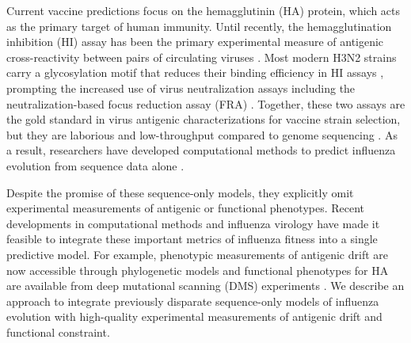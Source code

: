 Current vaccine predictions focus on the hemagglutinin (HA) protein, which acts as the primary target of human immunity.
Until recently, the hemagglutination inhibition (HI) assay has been the primary experimental measure of antigenic cross-reactivity between pairs of circulating viruses \citep{hirst1943studies}.
Most modern H3N2 strains carry a glycosylation motif that reduces their binding efficiency in HI assays \citep{Chambers:2015jt,Zost2017}, prompting the increased use of virus neutralization assays including the neutralization-based focus reduction assay (FRA) \citep{Okuno:1990uu}.
Together, these two assays are the gold standard in virus antigenic characterizations for vaccine strain selection, but they are laborious and low-throughput compared to genome sequencing \citep{Wood:2012ii}.
As a result, researchers have developed computational methods to predict influenza evolution from sequence data alone \citep{Luksza:2014hj,Steinbruck:2014kq,Neher:2014eu}.

Despite the promise of these sequence-only models, they explicitly omit experimental measurements of antigenic or functional phenotypes.
Recent developments in computational methods and influenza virology have made it feasible to integrate these important metrics of influenza fitness into a single predictive model.
For example, phenotypic measurements of antigenic drift are now accessible through phylogenetic models \citep{Neher:2016hy} and functional phenotypes for HA are available from deep mutational scanning (DMS) experiments \citep{Lee2018}.
We describe an approach to integrate previously disparate sequence-only models of influenza evolution with high-quality experimental measurements of antigenic drift and functional constraint.

